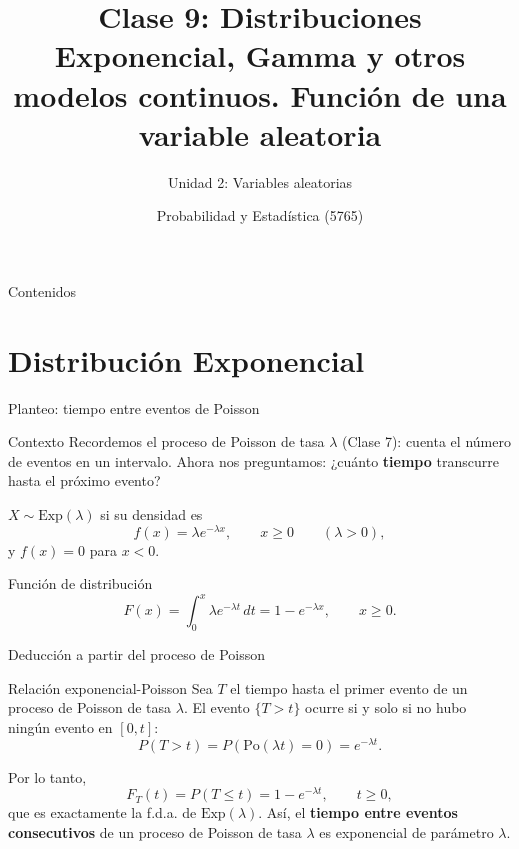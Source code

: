 \documentclass[aspectratio=169,11pt]{beamer}
\title[Prob. y Estadística]{Clase 9: Distribuciones Exponencial, Gamma y otros modelos continuos. Función de una variable aleatoria}
\subtitle{Unidad 2: Variables aleatorias}
\institute[UNS]{Universidad Nacional del Sur \\ Departamento de Matemática}
\author{Probabilidad y Estadística (5765)}
\date{}
\begin{document}
\begin{frame}
\titlepage
\end{frame}

\begin{frame}{Contenidos}
\tableofcontents
\end{frame}

\section{Distribución Exponencial}

\begin{frame}{Planteo: tiempo entre eventos de Poisson}
\begin{block}{Contexto}
Recordemos el proceso de Poisson de tasa $\lambda$ (Clase 7): cuenta el número de eventos en un intervalo. Ahora nos preguntamos: ¿cuánto \textbf{tiempo} transcurre hasta el próximo evento?
\end{block}

\begin{definition}
$X\sim\text{Exp}(\lambda)$ si su densidad es
$$f(x) = \lambda e^{-\lambda x}, \qquad x\ge 0 \qquad (\lambda>0),$$
y $f(x)=0$ para $x<0$.
\end{definition}

\begin{block}{Función de distribución}
$$F(x) = \int_0^x \lambda e^{-\lambda t}\,dt = 1-e^{-\lambda x}, \qquad x\ge 0.$$
\end{block}
\end{frame}

\begin{frame}{Deducción a partir del proceso de Poisson}
\begin{block}{Relación exponencial-Poisson}
Sea $T$ el tiempo hasta el primer evento de un proceso de Poisson de tasa $\lambda$. El evento $\{T>t\}$ ocurre si y solo si no hubo ningún evento en $[0,t]$:
$$P(T>t) = P(\text{Po}(\lambda t)=0) = e^{-\lambda t}.$$
\end{block}
Por lo tanto,
$$F_T(t) = P(T\le t) = 1-e^{-\lambda t}, \qquad t\ge 0,$$
que es exactamente la f.d.a. de $\text{Exp}(\lambda)$. Así, el \textbf{tiempo entre eventos consecutivos} de un proceso de Poisson de tasa $\lambda$ es exponencial de parámetro $\lambda$.
\end{frame}
\end{document}
